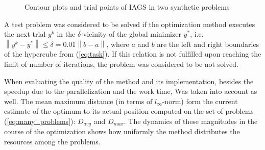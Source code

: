 \documentclass[runningheads]{llncs}
\begin{document}
\begin{figure}[ht]
    \centering
    \caption{Contour plots and trial points of IAGS in two synthetic problems}
    \label{fig:isolines}
\end{figure}

A test problem was considered to be solved if the optimization method executes the next trial
\(y^k\) in the \(\delta\)-vicinity of the global minimizer \(y^*\), i.e.
\(\left\|y^k-y^*\right\|\leqslant \delta = 0.01\left\|b-a\right\|\),
where \(a\) and \(b\) are the left and right boundaries of the hypercube from (\ref{eq:task}).
If this relation is not fulfilled upon reaching the limit of number of iterations, the problem was
considered to be not solved.

When evaluating the quality of the method and its implementation, besides the speedup due to
the parallelization and the work time,
Was taken into account as well.
The mean maximum distance (in terms of \(l_{\infty}\)-norm) form the current estimate of the
optimum to its actual position computed on the set of problems (\ref{eq:many_problems}):
\(D_{avg}\) and \(D_{max}\).
The dynamics of these magnitudes in the course of the optimization shows how uniformly the
method distributes the resources among the problems.
\end{document}
